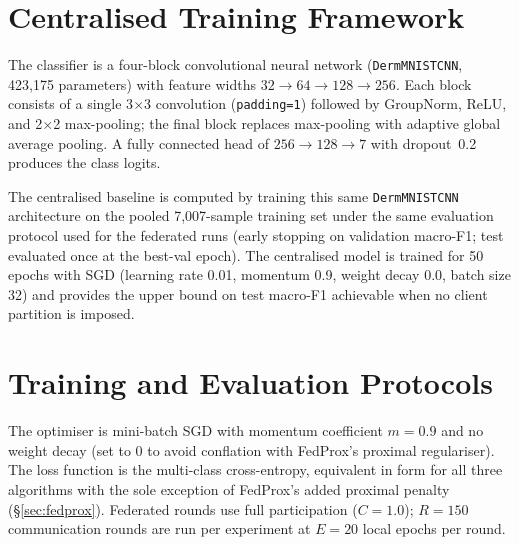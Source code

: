 \documentclass[11pt,a4paper]{report}  %
\begin{document}
\section{Centralised Training Framework}
\label{sec:centralised-method}


The classifier is a four-block convolutional neural network
(\texttt{DermMNISTCNN}, 423{,}175 parameters) with feature widths
$32 \to 64 \to 128 \to 256$. Each block consists of a single
3$\times$3 convolution (\texttt{padding=1}) followed by GroupNorm,
ReLU, and 2$\times$2 max-pooling; the final block replaces max-pooling
with adaptive global average pooling. A fully connected head of
$256 \to 128 \to 7$ with dropout~0.2 produces the class logits.

The centralised baseline is computed by training this same
\texttt{DermMNISTCNN} architecture on the pooled 7{,}007-sample training
set under the same evaluation protocol used for the federated runs
(early stopping on validation macro-F1; test evaluated once at the
best-val epoch). The centralised model is trained for 50 epochs with
SGD (learning rate 0.01, momentum 0.9, weight decay 0.0, batch size
32) and provides the upper bound on test macro-F1 achievable when no
client partition is imposed.

\section{Training and Evaluation Protocols}
\label{sec:training-protocols}


The optimiser is mini-batch SGD with momentum coefficient $m = 0.9$
and no weight decay (set to 0 to avoid conflation with FedProx's
proximal regulariser). The loss function is the multi-class
cross-entropy, equivalent in form for all three algorithms with the
sole exception of FedProx's added proximal penalty
(§\ref{sec:fedprox}). Federated rounds use full participation
($C = 1.0$); $R = 150$ communication rounds are run per experiment at
$E = 20$ local epochs per round.
\end{document}
